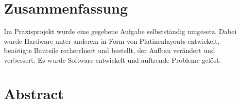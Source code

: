 \section*{Zusammenfassung}
\label{sec:Zusammenfassung}
 Im Praxisprojekt wurde eine gegebene Aufgabe selbstständig umgesetz. Dabei wurde Hardware unter anderem in Form von Platinenlayouts entwickelt, benötigte Bauteile recherchiert und bestellt, der Aufbau verändert und verbessert. Es wurde Software entwickelt und auftrende Probleme gelöst.

\section*{Abstract}
\label{sec:Abstract}
